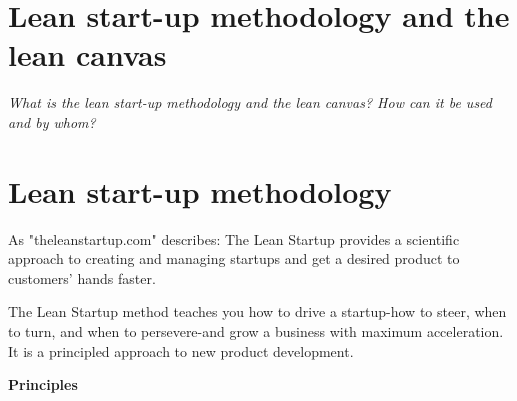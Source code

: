 \documentclass{article}
\begin{document}







\section{Lean start-up methodology and the lean canvas}


\textit{What is the lean start-up methodology and the lean canvas? How can it be used and by whom?}


\section{Lean start-up methodology}

As "theleanstartup.com" describes:
The Lean Startup provides a scientific approach to creating and managing startups and get a desired product to customers' hands faster.\par
The Lean Startup method teaches you how to drive a startup-how to steer, when to turn, and when to persevere-and grow a business with maximum acceleration.
It is a principled approach to new product development.

\textbf{Principles}
\end{document}
